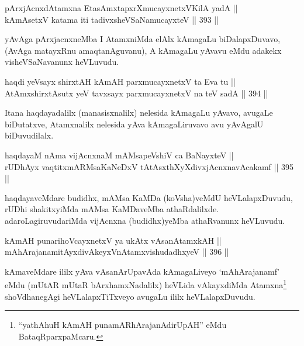 
\begin{shl}
pArxjAcnxdAtamxna EtasAmxtapxrXmucayxnetxV\s KilA yadA || \\
kAmAsetxV katama iti tadivxsheVSaNamucayxteV \hfill || 393 ||  
\end{shl}

\begin{artha}
yAvAga pArxjacnxneMba I AtamxniMda elAlx kAmagaLu biDalapxDuvavo,
(AvAga matayxRnu amaqtanAguvanu), A kAmagaLu yAvavu eMdu adakekx
visheVSaNavanunx heVLuvudu.
\end{artha}


\begin{shl}
haqdi yeV\s sayx shirxtAH kAmAH parxmucayxnetxV ta Eva tu || \\
AtAmxshirxtAsutx yeV tavxsayx parxmucayxnetxV na teV sadA \hfill || 394 ||  
\end{shl}

\begin{artha}
Itana haqdayadalilx (manasisxnalilx) nelesida kAmagaLu yAvavo, avugaLe
biDutatxve, Atamxnalilx nelesida yAva kAmagaLiruvavo avu yAvAgalU
biDuvudilalx.
\end{artha}

\begin{shl}
haqdayaM nAma vijAcnxnaM mAMsapeVshiV ca BaNayxteV || \\
rUDhAyx vaqtitxmARMsaKaNeDxV tAtAsxthXyXdivxjAcnxnavAcakamf \hfill || 395 ||  
\end{shl}

\begin{artha}
haqdayaveMdare budidhx, mAMsa KaMDa (koVsha)veMdU heVLalapxDuvudu,
rUDhi shakitxyiMda mAMsa KaMDaveMba
athaRdalilxde. adaroLagiruvudariMda vijAcnxna (budidhx)yeMba
athaRvanunx heVLuvudu.
\end{artha}


\begin{shl}
kAmAH punarihoVcayxnetxV ya ukAtx vAsanAtamxkAH || \\
mAhArajanamitAyxdivAkeyxVnA\s \s tamxvishudadhxyeV \hfill || 396 ||  
\end{shl}

\begin{artha}
kAmaveMdare ililx yAva vAsanArUpavAda kAmagaLiveyo `mAhArajanamf' eMdu (mUtAR mUtaR bArxhamxNadalilx) heVLida vAkayxdiMda Atamxna\footnote{``yathAhuH kAmAH punamARhArajanAdirUpAH'' eMdu BataqRparxpaMcaru.} shoVdhanegAgi heVLalapxTiTxveyo avugaLu ililx heVLalapxDuvudu.
\end{artha}

